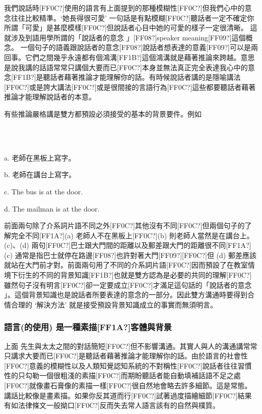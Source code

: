 我們說話時[FF0C?]使用的語言有上面提到的那種模糊性[FF0C?]但我們心中的意念往往比較精準。‘她長得很可愛' 一句話是有點模糊[FF0C?]聽話者一定不確定你所謂「可愛」是甚麼模樣[FF0C?]但說話者心目中她的可愛的樣子一定很清晰。 這就涉及到語用學所謂的「說話者的意念 」[FF08?]speaker meaning[FF09?]這個概念。 一個句子的語義跟說話者的意念[FF08?]說話者想表達的意義[FF09?]可以是兩回事。它們之間幾乎永遠都有個鴻溝[FF1B?]這個鴻溝就是藉著推論來跨越。意思是說我講的話語常常只講個大要而已[FF0C?]本身並無法真正完全表達我心中的意念[FF1B?]是聽話者藉著推論才能理解你的話。有時候說話者講的是隱喻講法[FF0C?]或是誇大講法[FF0C?]或是很間接的言語行為[FF0C?]這些都要聽話者藉著推論才能理解說話者的本意。

有些推論嚴格講是雙方都預設必須接受的基本的背景要件。例如

\ea%
\label{ex:key:13}
\gll\\
\\
\glt
\z

a.  老師在黑板上寫字。

b.  老師在講台上寫字。

c.  The bus is at the door.

d.  The mailman is at the door.

前面兩句除了介系詞片語不同之外[FF0C?]其他沒有不同[FF0C?]但兩個句子的了解完全不同[FF1A?](a) 老師人不在黑板上[FF0C?](b) 則老師人當然是在講台上。(c)、(d) 兩句[FF0C?]巴士跟大門間的距離以及郵差跟大門的距離很不同[FF1A?](c) 通常是指巴士就停在路邊[FF08?]也許對著大門[FF09?][FF0C?]但 (d) 郵差應該就站在大門前才對。前面兩句用了不同的介系詞片語[FF0C?]因而預設了在教室情境下衍生的不同的背景知識[FF1B?]也就是雙方認為是必要的共同的理解[FF0C?]雖然句子沒有明言[FF0C?]卻一定要成立[FF0C?]才滿足這句話的「說話者的意念 」。這個背景知識也是說話者所要表達的意念的一部分。因此雙方溝通時要得到合情合理的 ‘解決方法’ 就是接受預設背景知識成立的事實而無須明言。

\subsubsection{語言(的使用) 是一種素描[FF1A?]客體與背景} %

上面  先生與太太之間的對話簡短[FF0C?]但不影響溝通。其實人與人的溝通講常常只講求大要而已[FF0C?]是聽話者藉著推論才能理解你的話。由於語言的社會性[FF0C?]意義的模糊性以及人類知覺認知系統的不對稱性[FF0C?]說話者往往習慣性的只勾勒一個很粗淺的素描[FF0C?]而期盼聽話者能自動填補話語不足之處[FF0C?]就像畫石膏像的素描一樣[FF0C?]很自然地會略去許多細節。這是常態。講話比較像是畫素描。如果你反其道而行[FF0C?]試著過度描繪細節[FF0C?]結果有如法律條文一般拗口[FF0C?]反而失去常人語言該有的自然與樸質。

